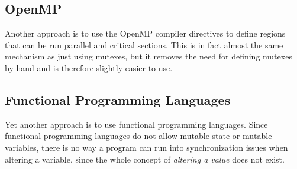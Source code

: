 \documentclass[12pt]{article}
\begin{document}
\subsection*{OpenMP}
Another approach is to use the OpenMP compiler directives to define regions that can be run parallel and
critical sections.
This is in fact almost the same mechanism as just using mutexes, but it removes the need for defining mutexes by hand and is therefore slightly easier to use.

\subsection*{Functional Programming Languages}
Yet another approach is to use functional programming languages.
Since functional programming languages do not allow mutable state or mutable variables,
there is no way a program can run into synchronization issues when altering a variable,
since the whole concept of \textit{altering a value} does not exist.
\end{document}
